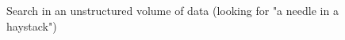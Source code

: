 \begin{figure}
\centering



\caption{Search in an unstructured volume of data (looking for "a needle in a haystack")}
\label{figQuantCompSearch}
\end{figure}